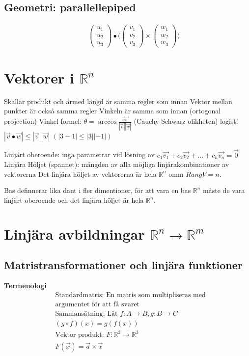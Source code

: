 \begin{multicols}{2}
\subsection{Geometri: parallellepiped}
\begin{align*}
  &\quad  \begin{pmatrix} u_1 \\ u_2 \\ u_3 \end{pmatrix} \bullet
  \Bigg( \begin{pmatrix} v_1 \\ v_2 \\ v_3 \end{pmatrix} \times \begin{pmatrix} w_1 \\ w_2 \\ w_3 \end{pmatrix} \Bigg)
\end{align*}


\section{Vektorer i $\mathbb{R}^n$}
Skallär produkt och ärmed längd är samma regler som innan
Vektor mellan punkter är också samma regler
Vinkeln är samma som innan (ortogonal projection)
Vinkel formel: $\theta=\arccos{\frac{\vec{v}\vec{w}}{|\vec{v}||\vec{w}|}}$
(Cauchy-Schwarz olikheten) logist! $|\vec{v}\bullet\vec{w}|\leq|\vec{v}||\vec{w}|$
$(|3-1|\leq|3||-1|)$

Linjärt oberoende: inga parametrar vid lösning av
$c_1\vec{v_1}+c_2\vec{v_2}+\ldots{}+c_n\vec{v_n}=\vec{0}$
Linjära Höljet (spannet): mängden av alla möjliga linjärakombinationer av vektorerna
Det linjära höljet av vektorerna är hela $\mathbb{R}^n$ omm $Rang{V}=n$.

Bas definnerar lika dant i fler dimentioner, för att vara en bas $\mathbb{R}^n$
måste de vara linjärt oberoende och det linjära höljet är hela $\mathbb{R}^n$.


\section{Linjära avbildningar $\mathbb{R}^n\to\mathbb{R}^m$}
\subsection{Matristransformationer och linjära funktioner}
\textbf{Termenologi}
\begin{align*}
  &\text{Standardmatris: En matris som multipliseras med} \\
  &\text{argumentet för att få svaret } \\
  &\text{Sammansätning: Låt } f:A\to B, g: B\to C \\
  &(g \circ f)(x)=g(f(x)) \\
  &\text{Vektor produkt: } F: \mathbb{R}^3\to\mathbb{R}^3 \\
  &F(\vec{x}) = \vec{a}\times\vec{x} \\
\end{align*}


\end{multicols}
